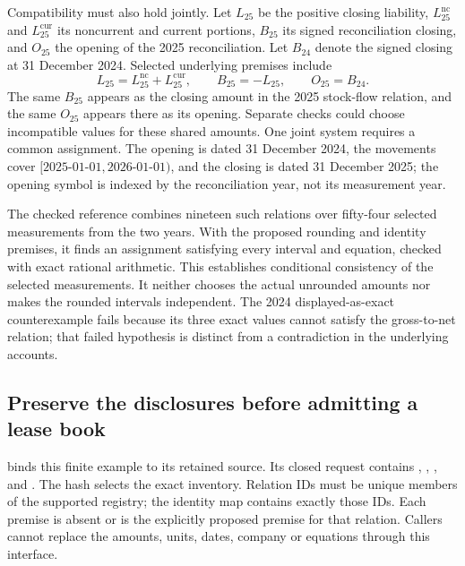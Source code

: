 Compatibility must also hold jointly. Let $L_{25}$ be the positive closing
liability, $L^{\mathrm{nc}}_{25}$ and $L^{\mathrm{cur}}_{25}$ its noncurrent and
current portions, $B_{25}$ its signed reconciliation closing, and $O_{25}$
the opening of the 2025 reconciliation. Let $B_{24}$
denote the signed closing at 31 December 2024. Selected underlying premises
include
\begin{equation}
\label{eq:henkel-shared-measurements}
 L_{25}=L^{\mathrm{nc}}_{25}+L^{\mathrm{cur}}_{25},
 \qquad B_{25}=-L_{25},
 \qquad O_{25}=B_{24}.
\end{equation}
The same $B_{25}$ appears as the closing amount in the 2025 stock-flow
relation, and the same $O_{25}$ appears there as its opening. Separate checks
could choose incompatible values for these shared amounts. One joint system
requires a common assignment. The opening is dated 31 December 2024, the
movements cover $[2025\text{-}01\text{-}01,2026\text{-}01\text{-}01)$, and
the closing is dated 31 December 2025; the opening symbol is indexed by the
reconciliation year, not its measurement year.

The checked reference combines nineteen such relations over fifty-four
selected measurements from the two years. With the proposed rounding and
identity premises, it finds an assignment satisfying every interval and
equation, checked with exact rational arithmetic. This establishes conditional
consistency of the selected measurements. It neither chooses the actual
unrounded amounts nor makes the rounded intervals independent. The 2024
displayed-as-exact counterexample fails because its three exact values cannot
satisfy the gross-to-net relation; that failed hypothesis is distinct from a
contradiction in the underlying accounts.

\subsection{Preserve the disclosures before admitting a lease book}

 binds this finite example to its retained
source. Its closed request contains , ,
,  and
. The hash selects the exact inventory. Relation IDs
must be unique members of the supported registry; the identity map contains
exactly those IDs. Each premise is absent or is the explicitly proposed
premise for that relation. Callers cannot replace the amounts, units, dates,
company or equations through this interface.

